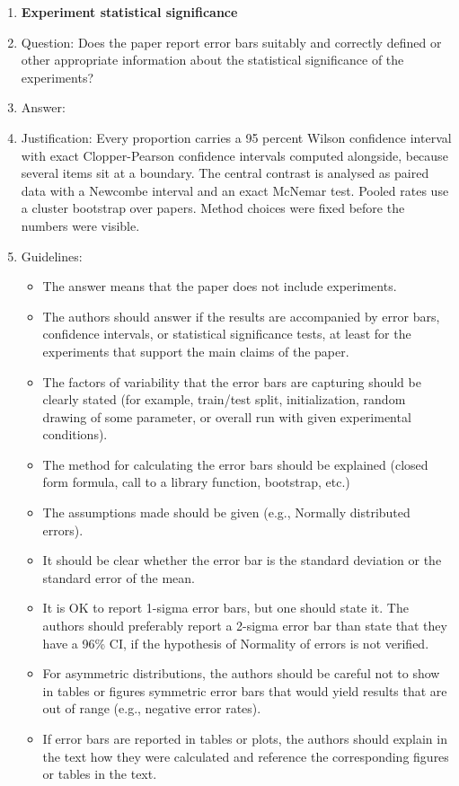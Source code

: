 \documentclass{article}
\begin{document}
\begin{enumerate}
\item {\bf Experiment statistical significance}
    \item[] Question: Does the paper report error bars suitably and correctly defined or other appropriate information about the statistical significance of the experiments?
    \item[] Answer: \answerYes{}
    \item[] Justification: Every proportion carries a 95 percent Wilson confidence interval with exact Clopper-Pearson confidence intervals computed alongside, because several items sit at a boundary. The central contrast is analysed as paired data with a Newcombe interval and an exact McNemar test. Pooled rates use a cluster bootstrap over papers. Method choices were fixed before the numbers were visible.
    \item[] Guidelines:
    \begin{itemize}
        \item The answer \answerNA{} means that the paper does not include experiments.
        \item The authors should answer \answerYes{} if the results are accompanied by error bars, confidence intervals, or statistical significance tests, at least for the experiments that support the main claims of the paper.
        \item The factors of variability that the error bars are capturing should be clearly stated (for example, train/test split, initialization, random drawing of some parameter, or overall run with given experimental conditions).
        \item The method for calculating the error bars should be explained (closed form formula, call to a library function, bootstrap, etc.)
        \item The assumptions made should be given (e.g., Normally distributed errors).
        \item It should be clear whether the error bar is the standard deviation or the standard error of the mean.
        \item It is OK to report 1-sigma error bars, but one should state it. The authors should preferably report a 2-sigma error bar than state that they have a 96\% CI, if the hypothesis of Normality of errors is not verified.
        \item For asymmetric distributions, the authors should be careful not to show in tables or figures symmetric error bars that would yield results that are out of range (e.g., negative error rates).
        \item If error bars are reported in tables or plots, the authors should explain in the text how they were calculated and reference the corresponding figures or tables in the text.
    \end{itemize}


\end{enumerate}
\end{document}
